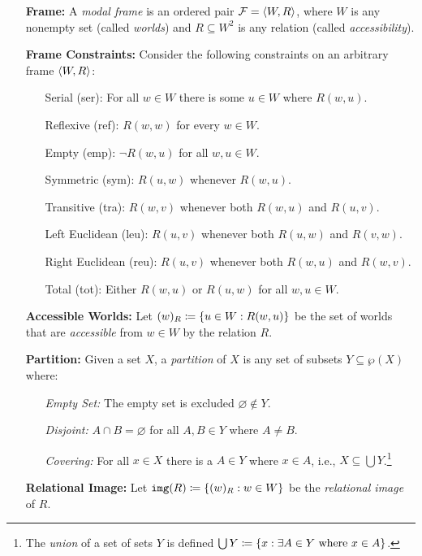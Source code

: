 \documentclass[a4paper, 11pt]{article} %
\begin{document}
\begin{enumerate}[leftmargin=1.2in] %
  \item[\bf Frame:] A \textit{modal frame} is an ordered pair $\mathcal{F} = \langle W,R\rangle$, where $W$ is any nonempty set (called \textit{worlds}) and $R \subseteq W^2$ is any relation (called \textit{accessibility}).
  \item[\bf Frame Constraints:]
    Consider the following constraints on an arbitrary frame $\langle W, R\rangle$:
    \begin{itemize}
      \item[\sc Serial (ser):] For all $w \in W$ there is some $u \in W$ where $R(w,u)$.
      \item[\sc Reflexive (ref):] $R(w,w)$ for every $w\in W$.
      \item[\sc Empty (emp):] $\neg R(w,u)$ for all $w, u\in W$.
      \item[\sc Symmetric (sym):] $R(u,w)$ whenever $R(w,u)$. 
      \item[\sc Transitive (tra):] $R(w,v)$ whenever both $R(w,u)$ and $R(u,v)$. 
      \item[\sc Left Euclidean (leu):] $R(u,v)$ whenever both $R(u,w)$ and $R(v,w)$. 
      \item[\sc Right Euclidean (reu):] $R(u,v)$ whenever both $R(w,u)$ and $R(w,v)$. 
      \item[\sc Total (tot):] Either $R(w,u)$ or $R(u,w)$ for all $w,u \in W$. 
    \end{itemize}
  \item[\bf Accessible Worlds:] Let $(w)_R \coloneq \lbrace u \in W : R(w,u)\rbrace$ be the set of worlds that are \textit{accessible} from $w \in W$ by the relation $R$.
  \item[\bf Partition:] Given a set $X$, a \textit{partition} of $X$ is any set of subsets $Y \subseteq \wp(X)$ where:
    \begin{itemize}
      \item[\it Empty Set:] The empty set is excluded $\varnothing \notin Y$.
      \item[\it Disjoint:] $A \cap B = \varnothing$ for all $A, B \in Y$ where $A \neq B$. 
      \item[\it Covering:] For all $x \in X$ there is a $A \in Y$ where $x \in A$, i.e., $X \subseteq \bigcup Y$.\footnote{The \textit{union} of a set of sets $Y$ is defined $\bigcup Y \coloneq \lbrace x : \exists A \in Y \text{ where } x \in A\rbrace$.}
    \end{itemize}
  \item[\bf Relational Image:] Let $\mathtt{img}(R) \coloneq \lbrace(w)_R : w \in W\rbrace$ be the \textit{relational image} of $R$.
\end{enumerate}
\end{document}
